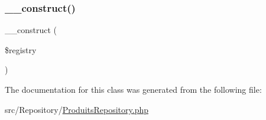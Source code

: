 \subsubsection{\texorpdfstring{\+\_\+\+\_\+construct()}{\_\_construct()}}
{\footnotesize\ttfamily \+\_\+\+\_\+construct (\begin{DoxyParamCaption}\item[{Manager\+Registry}]{\$registry }\end{DoxyParamCaption})}



The documentation for this class was generated from the following file\+:\begin{DoxyCompactItemize}
\item 
src/\+Repository/\mbox{\hyperlink{_produits_repository_8php}{Produits\+Repository.\+php}}\end{DoxyCompactItemize}
